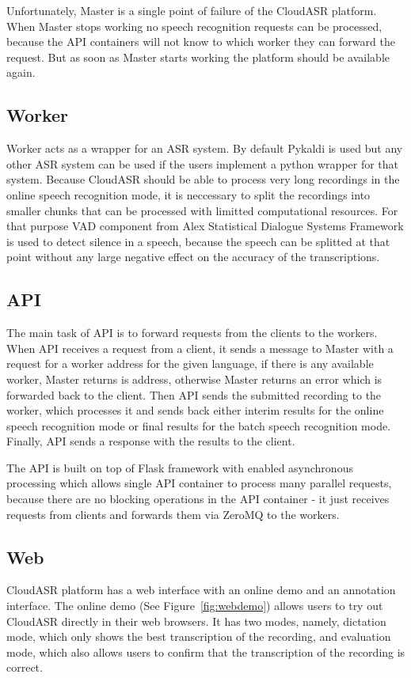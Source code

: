 Unfortunately, Master is a single point of failure of the CloudASR platform.
When Master stops working no speech recognition requests can be processed,
  because the API containers will not know to which worker they can forward the request.
But as soon as Master starts working the platform should be available again.


\subsection{Worker}
Worker acts as a wrapper for an ASR system.
By default Pykaldi is used but any other ASR system can be used
  if the users implement a python wrapper for that system.
Because CloudASR should be able to process very long recordings in the online speech recognition mode,
  it is neccessary to split the recordings into smaller chunks
  that can be processed with limitted computational resources.
For that purpose VAD component from Alex Statistical Dialogue Systems Framework \cite{jurcicek2014alex} is used to detect silence in a speech,
  because the speech can be splitted at that point without any large negative effect on the accuracy of the transcriptions.


\subsection{API}
The main task of API is to forward requests from the clients to the workers.
When API receives a request from a client,
  it sends a message to Master with a request for a worker address for the given language,
  if there is any available worker, Master returns is address,
  otherwise Master returns an error which is forwarded back to the client.
Then API sends the submitted recording to the worker,
  which processes it
    and sends back either interim results for the online speech recognition mode
      or final results for the batch speech recognition mode.
Finally, API sends a response with the results to the client.

The API is built on top of Flask framework with enabled asynchronous processing
  which allows single API container to process many parallel requests,
  because there are no blocking operations in the API container -
  it just receives requests from clients and forwards them via ZeroMQ to the workers.



\subsection{Web}
CloudASR platform has a web interface with an online demo and an annotation interface.
The online demo (See Figure~\ref{fig:webdemo}) allows users to try out CloudASR directly in their web browsers.
It has two modes, namely, dictation mode, which only shows the best transcription of the recording,
  and evaluation mode, which also allows users to confirm that the transcription of the recording is correct.

